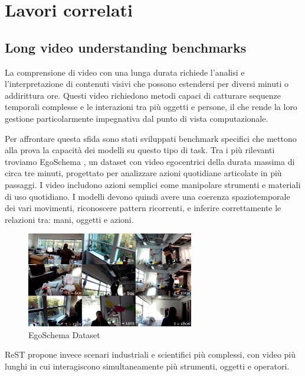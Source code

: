 \chapter{Lavori correlati}
\section{Long video understanding benchmarks}
La comprensione di video con una lunga durata richiede l'analisi e l'interpretazione di contenuti visivi che possono estendersi per diversi minuti o addirittura ore. Questi video richiedono metodi capaci di catturare sequenze temporali complesse e le interazioni tra più oggetti e persone, il che rende la loro gestione  particolarmente impegnativa dal punto di vista computazionale.

Per affrontare questa sfida sono stati sviluppati benchmark specifici che mettono alla prova la capacità dei modelli su questo tipo di task. Tra i più rilevanti troviamo EgoSchema \cite{mangalam2023egoschemadiagnosticbenchmarklongform}, un dataset con video egocentrici della durata massima di circa tre minuti, progettato per analizzare azioni quotidiane articolate in più passaggi. I video includono azioni semplici come manipolare strumenti e materiali di uso quotidiano. I modelli devono quindi avere una coerenza spaziotemporale dei vari movimenti, riconoscere pattern ricorrenti, e inferire correttamente le relazioni tra: mani, oggetti e azioni.

\begin{figure}[H]
    \centering
    \includegraphics[width=0.65\textwidth]{Images/egoschema.png}
    \caption{EgoSchema Dataset}
    \label{fig:egoschema}
\end{figure}

ReST \cite{Yang_2023_CVPR} propone invece scenari industriali e scientifici più complessi, con video più lunghi in cui interagiscono simultaneamente più strumenti, oggetti e operatori.

